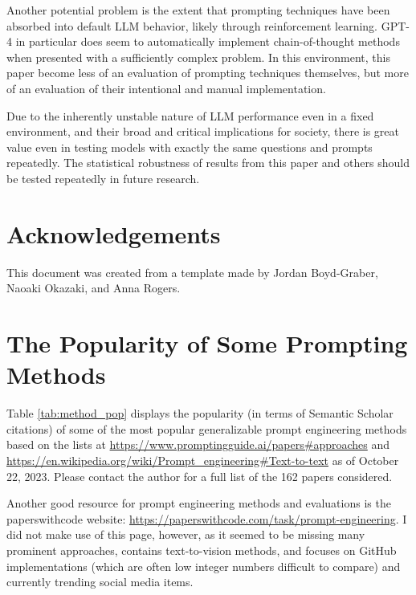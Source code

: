 \documentclass[11pt]{article}
\begin{document}
Another potential problem is the extent that prompting techniques have been absorbed into default LLM behavior, likely through reinforcement learning. GPT-4 in particular does seem to automatically implement chain-of-thought methods when presented with a sufficiently complex problem. In this environment, this paper become less of an evaluation of prompting techniques themselves, but more of an evaluation of their intentional and manual implementation.

Due to the inherently unstable nature of LLM performance even in a fixed environment, and their broad and critical implications for society, there is great value even in testing models with exactly the same questions and prompts repeatedly. The statistical robustness of results from this paper and others should be tested repeatedly in future research.

\section*{Acknowledgements}
This document was created from a template made by Jordan Boyd-Graber, Naoaki Okazaki, and Anna Rogers.




\clearpage
\newpage

\onecolumn
\setlength{\parindent}{0cm}
\setlength\parskip{1em plus 0.1em minus 0.2em}
\appendix

\section{The Popularity of Some Prompting Methods}
\label{sec:popularity}

Table \ref{tab:method_pop} displays the popularity (in terms of Semantic Scholar citations) of some of the most popular generalizable prompt engineering methods based on the lists at \url{https://www.promptingguide.ai/papers#approaches} and \url{https://en.wikipedia.org/wiki/Prompt_engineering#Text-to-text} as of October 22, 2023. Please contact the author for a full list of the 162 papers considered.

Another good resource for prompt engineering methods and evaluations is the paperswithcode website: \url{https://paperswithcode.com/task/prompt-engineering}. I did not make use of this page, however, as it seemed to be missing many prominent approaches, contains text-to-vision methods, and focuses on GitHub implementations (which are often low integer numbers difficult to compare) and currently trending social media items.
\end{document}
